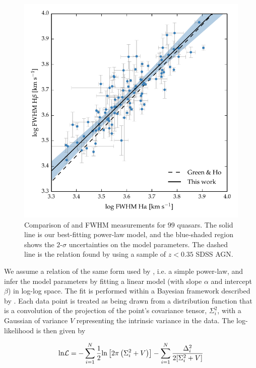 \begin{figure}[t!]
    \centering 
    \includegraphics[width=0.8\columnwidth]{figures/chapter03/ha_hb_width_comparison.pdf} 
    \caption[{Comparison of \ha and \hb FWHM measurements for $99$ quasars.}]{Comparison of \ha and \hb FWHM measurements for $99$ quasars. The solid line is our best-fitting power-law model, and the blue-shaded region shows the $2$-$\sigma$ uncertainties on the model parameters. The dashed line is the relation found by \citet{greene05b} using a sample of $z<0.35$ SDSS AGN.} 
    \label{fig:hahbcomp}
\end{figure}

We assume a relation of the same form used by \citet{greene05b}, i.e. a simple power-law, and infer the model parameters by fitting a linear model (with slope $\alpha$ and intercept $\beta$) in log-log space.
The fit is performed within a Bayesian framework described by \citet{hogg10}. 
Each data point is treated as being drawn from a distribution function that is a convolution of the projection of the point's covariance tensor, $\Sigma_i^2$, with a Gaussian of variance $V$ representing the intrinsic variance in the data.
The log-likelihood is then given by 

\begingroup\makeatletter{}\check@mathfonts
\begin{eqnarray}
  \text{ln} {\cal L} = - \sum_{i=1}^N \frac{1}{2} \text{ln}\left[2\pi\left(\Sigma_i^2 + V\right)\right] - \sum_{i=1}^N \frac{\Delta_i^2}{2[\Sigma_i^2 + V]} 
\end{eqnarray}
\endgroup

